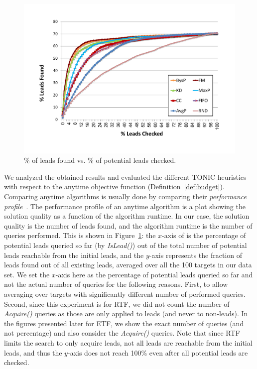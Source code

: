 \documentclass[journal]{IEEEtran}
\newcommand{\islead}[1]{{\em IsLead(#1)}}
\newcommand{\acquire}[1]{{\em Acquire(#1)}}
\begin{document}
 
\begin{figure}%
\centering
\includegraphics[width=0.9\columnwidth,  trim={2.0cm 2.5cm 2.5cm 2.0cm},clip]{BTF_all.pdf}
\caption{\% of leads found vs. \% of potential leads checked.}
\label{fig:checkedVsFound}
\end{figure}
We analyzed the obtained results and evaluated the different TONIC heuristics with respect to the anytime objective function (Definition~\ref{def:budget}). 
Comparing anytime algorithms is usually done by comparing their \emph{performance profile}~\cite{zilberstein96usingAnytime}. The performance profile of an anytime algorithm is a plot showing the solution quality as a function of the algorithm runtime. In our case, the solution quality is the number of leads found, and the algorithm runtime is the number of queries performed. This is shown in Figure~\ref{fig:checkedVsFound}: the $x$-axis of is the  percentage of potential leads queried so far (by \islead{}) out of the total number of potential leads reachable from the initial leads, and the $y$-axis represents the fraction of leads found out of all existing leads, averaged over all the 100 targets in our data set. 
We set the $x$-axis here as the percentage of potential leads queried so far and not the actual number of queries for the following reasons. First, to allow averaging over targets with significantly different number of performed queries. Second, since this experiment is for RTF, we did not count the number of \acquire{} queries as those are only applied to leads (and never to non-leads). In the figures presented later for ETF,  we show the exact number of queries (and not percentage) and also consider the \acquire{} queries. 
Note that since RTF limits the search to only acquire leads, not all leads are reachable from the initial leads, and thus the $y$-axis does not reach 100\% even after all potential leads are checked. 
\end{document}
